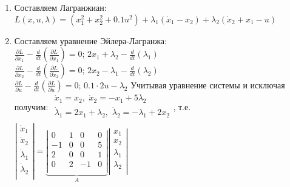 \documentclass[preprint,russian,a5paper,10pt,twoside]{ncc}
\begin{document}
\begin{enumerate}
\item Составляем Лагранжиан:
$L\left( x,u,\lambda  \right)=\left( x_{1}^{2}+x_{2}^{2}+0.1{{u}^{2}} \right)+{{\lambda }_{1}}\left( {{{\dot{x}}}_{1}}-{{x}_{2}} \right)+{{\lambda }_{2}}\left( {{{\dot{x}}}_{2}}+{{x}_{1}}-u \right)$
\item Составляем уравнение Эйлера-Лагранжа:
\\$\frac{\partial L}{\partial {{x}_{1}}}-\frac{d}{dt}\left( \frac{\partial L}{\partial {{{\dot{x}}}_{1}}} \right)=0$; $2{{x}_{1}}+{{\lambda }_{2}}-\frac{d}{dt}\left( {{\lambda }_{1}} \right)$
\\$\frac{\partial L}{\partial {{x}_{2}}}-\frac{d}{dt}\left( \frac{\partial L}{\partial {{{\dot{x}}}_{2}}} \right)=0$; $2{{x}_{2}}-{{\lambda }_{1}}-\frac{d}{dt}\left( {{\lambda }_{2}} \right)$
\\$\frac{\partial L}{\partial u}-\frac{d}{dt}\left( \frac{\partial L}{\partial \dot{u}} \right)=0$; $0.1\cdot 2u-{{\lambda }_{2}}$ 
Учитывая уравнение системы и исключая получим:
$\begin{array}{*{35}{l}}
   {{{\dot{x}}}_{1}}={{x}_{2}},\,\,{{{\dot{x}}}_{2}}=-{{x}_{1}}+5{{\lambda }_{2}}  \\
   {{{\dot{\lambda }}}_{1}}=2{{x}_{1}}+{{\lambda }_{2}},\,\,{{{\dot{\lambda }}}_{2}}=-{{\lambda }_{1}}+2{{x}_{2}}  \\
\end{array}$, т.е. $\left| \begin{matrix}
   {{{\dot{x}}}_{1}}  \\
   {{{\dot{x}}}_{2}}  \\
   {{{\dot{\lambda }}}_{1}}  \\
   {{{\dot{\lambda }}}_{2}}  \\
\end{matrix} \right|=\underbrace{\left| \begin{matrix}
   0 & 1 & 0 & 0  \\
   -1 & 0 & 0 & 5  \\
   2 & 0 & 0 & 1  \\
   0 & 2 & -1 & 0  \\
\end{matrix} \right|}_{A}\left| \begin{matrix}
   {{x}_{1}}  \\
   {{x}_{2}}  \\
   {{\lambda }_{1}}  \\
   {{\lambda }_{2}}  \\
\end{matrix} \right|$

\end{enumerate}
\end{document}
